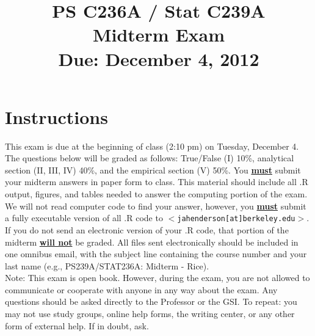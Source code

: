 \documentclass{article}
\title{PS C236A / Stat C239A \\  Midterm Exam \\ Due: December 4, 2012}
\date{}
\begin{document}
\maketitle
\vspace{-4em}
\section*{Instructions}





\noindent This exam is due at the beginning of class (2:10 pm) on
Tuesday, December 4. The questions below will be graded as follows:
True/False (I) 10\%, analytical section (II, III, IV) 40\%, and the
empirical section (V) 50\%.  You \underline{\bf must} submit your
midterm answers in paper form to class.  This material should include
all .R output, figures, and tables needed to answer the computing
portion of the exam.  We will not read computer code to find your
answer, however, you \underline{\bf must} submit a fully executable
version of all .R code to
$<$\texttt{jahenderson[at]berkeley.edu}$>$. If you do not send an
electronic version of your .R code, that portion of the midterm
\underline{\bf will not} be graded.  All files sent electronically
should be included
in one omnibus email, with the subject line containing the course number and your last name (e.g., PS239A/STAT236A: Midterm - Rice).\\


\noindent Note: This exam is open book.  However, during the exam,
you are not allowed to communicate or cooperate with anyone in
any way about the exam. Any questions should be asked directly to the
Professor or the GSI. To repeat: you may not use study groups, online
help forms, the writing center, or any other form of external help.
If in doubt, ask.
\end{document}
